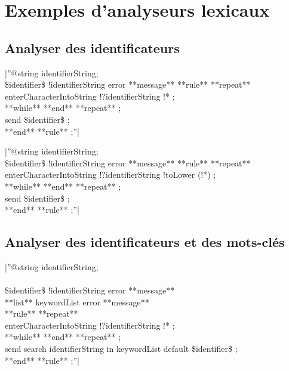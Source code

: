 
\section{Exemples d'analyseurs lexicaux}

\subsection{Analyser des identificateurs}

|''@string identifierString;\\
\$identifier\$ !identifierString error **message** %
**rule** %
 **repeat**\\
  enterCharacterIntoString !?identifierString !* ;\\
 **while** %
 **end** **repeat** ;\\
 send \$identifier\$ ;\\
**end** **rule** ;''|

|''@string identifierString;\\
\$identifier\$ !identifierString error **message** %
**rule** %
 **repeat**\\
  enterCharacterIntoString !?identifierString !toLower (!*) ;\\
 **while** %
 **end** **repeat** ;\\
 send \$identifier\$ ;\\
**end** **rule** ;''|

\subsection{Analyser des identificateurs et des mots-clés}

|''@string identifierString;\\
\\
\$identifier\$ !identifierString error **message** %
\\
**list** keywordList error **message** %
\\
**rule** %
 **repeat**\\
  enterCharacterIntoString !?identifierString !* ;\\
 **while** %
 **end** **repeat** ;\\
 send search identifierString in keywordList  default \$identifier\$ ;\\
**end** **rule** ;''|

